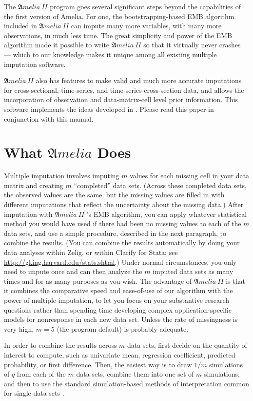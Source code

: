 \documentclass[12pt,titlepage]{article}
\newcommand{\AmeliaII}{\ensuremath{\mathfrak Amelia~II} }
\begin{document}
The \AmeliaII program goes several significant steps beyond the
capabilities of the first version of Amelia.  For one, the
bootstrapping-based EMB algorithm included in \AmeliaII can impute many
more variables, with many more observations, in much less time.  The
great simplicity and power of the EMB algorithm made it possible to
write \AmeliaII so that it virtually never crashes --- which to our
knowledge makes it unique among all existing multiple imputation
software.  

\AmeliaII also has features to make valid and much more accurate
imputations for cross-sectional, time-series, and
time-series-cross-section data, and allows the incorporation of
observation and data-matrix-cell level prior information.  This
software implements the ideas developed in \citet*{HonKin06}.  Please
read this paper in conjunction with this manual.

\section{What ${\mathfrak Amelia}$ Does}
\label{sec:what}

Multiple imputation involves imputing $m$ values for each missing cell
in your data matrix and creating $m$ ``completed'' data sets.  (Across
these completed data sets, the observed values are the same, but the
missing values are filled in with different imputations that reflect
the uncertainty about the missing data.)  After imputation with
\AmeliaII's EMB algorithm, you can apply whatever statistical method
you would have used if there had been no missing values to each of the
$m$ data sets, and use a simple procedure, described in the next
paragraph, to combine the results.  (You can combine the results
automatically by doing your data analyses within Zelig, or within
Clarify for Stata; see \url{http://gking.harvard.edu/stats.shtml}.)
Under normal circumstances, you only need to impute once and can then
analyze the $m$ imputed data sets as many times and for as many
purposes as you wish.  The advantage of \AmeliaII is that it combines
the comparative speed and ease-of-use of our algorithm with the power
of multiple imputation, to let you focus on your substantive research
questions rather than spending time developing complex
application-specific models for nonresponse in each new data set.
Unless the rate of missingness is very high, $m = 5$ (the program
default) is probably adequate.

In order to combine the results across $m$ data sets, first decide on
the quantity of interest to compute, such as univariate mean,
regression coefficient, predicted probability, or first difference.
Then, the easiest way is to draw $1/m$ simulations of $q$ from each of
the $m$ data sets, combine them into one set of $m$ simulations, and
then to use the standard simulation-based methods of interpretation
common for single data sets \citep{KinTomWit00}.
\end{document}
